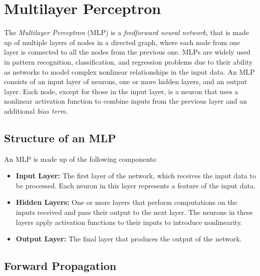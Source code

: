 \section{Multilayer Perceptron}
The \emph{Multilayer Perceptron} (MLP) \cite{multilayer_perceptron} is a \emph{feedforward neural network}, that is made up of multiple layers of nodes in a directed graph, where each node from one layer is connected to all the nodes from the previous one.
MLPs are widely used in pattern recognition, classification, and regression problems due to their ability as networks to model complex nonlinear relationships in the input data.
An MLP consists of an input layer of neurons, one or more hidden layers, and an output layer.
Each node, except for those in the input layer, is a neuron that uses a nonlinear activation function to combine inputs from the previous layer and an additional \emph{bias term}.

\subsection{Structure of an MLP}

An MLP is made up of the following components:
\begin{itemize}
	\item \textbf{Input Layer:} The first layer of the network, which receives the input data to be processed. Each neuron in this layer represents a feature of the input data.
	\item \textbf{Hidden Layers:} One or more layers that perform computations on the inputs received and pass their output to the next layer. The neurons in these layers apply activation functions to their inputs to introduce nonlinearity.
	\item \textbf{Output Layer:} The final layer that produces the output of the network.
\end{itemize}

\subsection{Forward Propagation}

